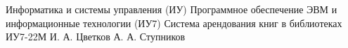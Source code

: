 \makecourseworktitle
{Информатика и системы управления (ИУ)}
{Программное обеспечение ЭВМ и информационные технологии (ИУ7)}
{Система арендования книг в библиотеках}
{ИУ7-22М}
{И. А. Цветков}
{А. А. Ступников}
{}
{}
